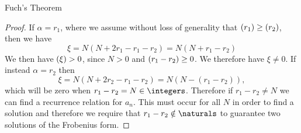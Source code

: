 \documentclass[fleqn]{NotesClass}
\let\Re\relax
\DeclareMathOperator{\Re}{Re}
\begin{document}
\begin{thm}{Fuch's Theorem}{}
\begin{proof}
            If \(\alpha = r_1\), where we assume without loss of generality that \(\Re(r_1) \ge \Re(r_2)\), then we have
            \begin{equation}
                \xi = N(N + 2r_1 - r_1 - r_2) = N(N + r_1 - r_2)
            \end{equation}
            We then have \(\Re(\xi) > 0\), since \(N > 0\) and \(\Re(r_1 - r_2) \ge 0\).
            We therefore have \(\xi \ne 0\).
            If instead \(\alpha = r_2\) then
            \begin{equation}
                \xi = N(N + 2r_2 - r_1 - r_2) = N(N - (r_1 - r_2)),
            \end{equation}
            which will be zero when \(r_1 - r_2 = N \in \integers\).
            Therefore if \(r_1 - r_2 \ne N\) we can find a recurrence relation for \(a_n\).
            This must occur for all \(N\) in order to find a solution and therefore we require that \(r_1 - r_2 \notin \naturals\) to guarantee two solutions of the Frobenius form.
            

\end{proof}
\end{thm}
\end{document}
